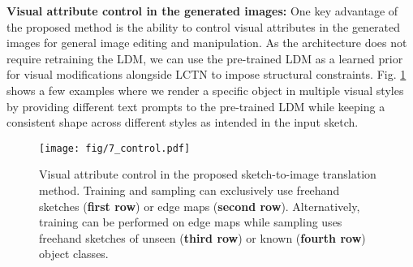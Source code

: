\vspace{-1.0em}

\noindent
\textbf{Visual attribute control in the generated images:} One key advantage of the proposed method is the ability to control visual attributes in the generated images for general image editing and manipulation. As the architecture does not require retraining the LDM, we can use the pre-trained LDM as a learned prior for visual modifications alongside LCTN to impose structural constraints. Fig. \ref{fig:visual_control} shows a few examples where we render a specific object in multiple visual styles by providing different text prompts to the pre-trained LDM while keeping a consistent shape across different styles as intended in the input sketch.

\begin{figure}[t]
  \centering
  \texttt{[image: fig/7\_control.pdf]}
  \caption{Visual attribute control in the proposed sketch-to-image translation method. Training and sampling can exclusively use freehand sketches (\textbf{first row}) or edge maps (\textbf{second row}). Alternatively, training can be performed on edge maps while sampling uses freehand sketches of unseen (\textbf{third row}) or known (\textbf{fourth row}) object classes.}
  \label{fig:visual_control}
  \vspace{-1.0em}
\end{figure}
